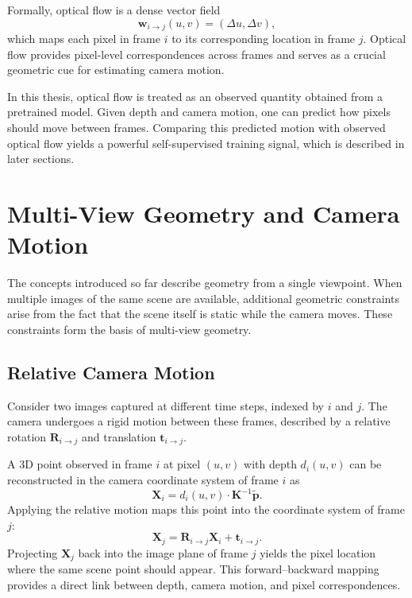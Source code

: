 Formally, optical flow is a dense vector field
\begin{equation}
    \mathbf{w}_{i\to j}(u,v) = (\Delta u, \Delta v),
\end{equation}
which maps each pixel in frame $i$ to its corresponding location in frame $j$. Optical flow provides pixel-level correspondences across frames and serves as a crucial geometric cue for estimating camera motion.

In this thesis, optical flow is treated as an observed quantity obtained from a pretrained model. Given depth and camera motion, one can predict how pixels should move between frames. Comparing this predicted motion with observed optical flow yields a powerful self-supervised training signal, which is described in later sections.

\section{Multi-View Geometry and Camera Motion}
The concepts introduced so far describe geometry from a single viewpoint. When multiple images of the same scene are available, additional geometric constraints arise from the fact that the scene itself is static while the camera moves. These constraints form the basis of multi-view geometry.

\subsection{Relative Camera Motion}
Consider two images captured at different time steps, indexed by $i$ and $j$. The camera undergoes a rigid motion between these frames, described by a relative rotation $\mathbf{R}_{i\to j}$ and translation $\mathbf{t}_{i\to j}$.

A 3D point observed in frame $i$ at pixel $(u,v)$ with depth $d_i(u,v)$ can be reconstructed in the camera coordinate system of frame $i$ as
\begin{equation}
    \mathbf{X}_i = d_i(u,v) \cdot \mathbf{K}^{-1} \tilde{\mathbf{p}}.
\end{equation}
Applying the relative motion maps this point into the coordinate system of frame $j$:
\begin{equation}
    \mathbf{X}_j = \mathbf{R}_{i\to j} \mathbf{X}_i + \mathbf{t}_{i\to j}.
\end{equation}
Projecting $\mathbf{X}_j$ back into the image plane of frame $j$ yields the pixel location where the same scene point should appear. This forward--backward mapping provides a direct link between depth, camera motion, and pixel correspondences.

